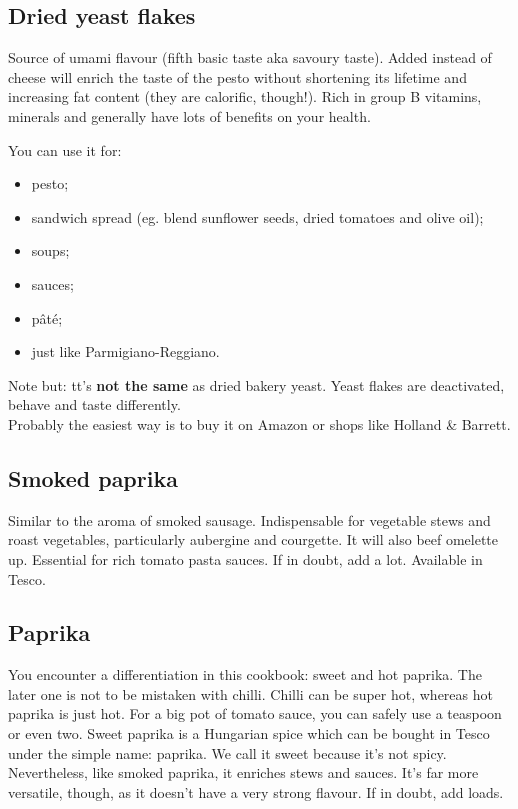 \subsection*{Dried yeast flakes}

Source of umami flavour (fifth basic taste aka savoury taste).
Added instead of cheese will enrich the taste of the pesto without shortening its lifetime and increasing fat content (they are calorific, though!).
Rich in group B vitamins, minerals and generally have lots of benefits on your health. 

You can use it for:

\begin{itemize}
    \setlength\itemsep{0.1mm}
    \item pesto;
    \item sandwich spread (eg. blend sunflower seeds, dried tomatoes and olive oil);
    \item soups;
    \item sauces; 
    \item pâté;
    \item just like Parmigiano-Reggiano.
\end{itemize}

Note but: tt's \textbf{not the same} as dried bakery yeast.
Yeast flakes are deactivated, behave and taste differently.
\\
Probably the easiest way is to buy it on Amazon or shops like Holland \& Barrett.

\subsection* {Smoked paprika}
Similar to the aroma of smoked sausage.
Indispensable for vegetable stews and roast vegetables, particularly aubergine and courgette.
It will also beef omelette up. 
Essential for rich tomato pasta sauces. If in doubt, add a lot.
Available in Tesco.

\subsection*{Paprika}
You encounter a differentiation in this cookbook: sweet and hot paprika.
The later one is not to be mistaken with chilli.
Chilli can be super hot, whereas hot paprika is just hot.
For a big pot of tomato sauce, you can safely use a teaspoon or even two.
Sweet paprika is a Hungarian spice which can be bought in Tesco under the simple name: paprika.
We call it sweet because it's not spicy.
Nevertheless, like smoked paprika, it enriches stews and sauces.
It's far more versatile, though, as it doesn't have a very strong flavour.
If in doubt, add loads.


